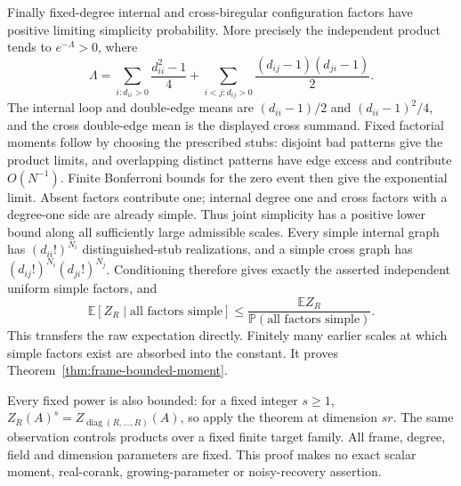 Finally fixed-degree internal and cross-biregular configuration
factors have positive limiting simplicity probability. More precisely
the independent product tends to $e^{-\Lambda}>0$, where
\[
 \Lambda=\sum_{i:d_{ii}>0}\frac{d_{ii}^2-1}{4}
       +\sum_{i<j:d_{ij}>0}\frac{(d_{ij}-1)(d_{ji}-1)}2.
\]
The internal loop and double-edge means are $(d_{ii}-1)/2$ and
$(d_{ii}-1)^2/4$, and the cross double-edge mean is the displayed
cross summand. Fixed factorial moments follow by choosing the
prescribed stubs: disjoint bad patterns give the product limits,
and overlapping distinct patterns have edge excess and contribute
$O(N^{-1})$. Finite Bonferroni bounds for the zero event then give
the exponential limit. Absent factors contribute one; internal degree
one and cross factors with a degree-one side are already simple.
Thus joint simplicity has a positive lower bound along all sufficiently
large admissible scales. Every simple internal graph has
$(d_{ii}!)^{N_i}$ distinguished-stub realizations, and a simple cross
graph has $(d_{ij}!)^{N_i}(d_{ji}!)^{N_j}$. Conditioning therefore
gives exactly the asserted independent uniform simple factors, and
\[
 \mathbb E[Z_R\mid\text{all factors simple}]
 \le\frac{\mathbb E Z_R}{\mathbb P(\text{all factors simple})}.
\]
This transfers the raw expectation directly. Finitely many earlier
scales at which simple factors exist are absorbed into the constant.
It proves Theorem~\ref{thm:frame-bounded-moment}.

Every fixed power is also bounded: for a fixed integer $s\ge1$,
$Z_R(A)^s=Z_{\operatorname{diag}(R,\ldots,R)}(A)$, so apply the
theorem at dimension $sr$. The same observation controls products
over a fixed finite target family. All frame, degree, field and
dimension parameters are fixed. This proof makes no exact scalar
moment, real-corank, growing-parameter or noisy-recovery assertion.
